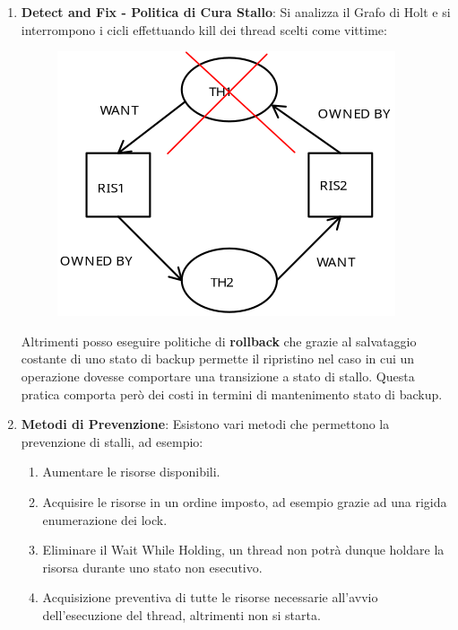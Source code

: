 \documentclass{article}
\begin{document}
\begin{enumerate}
    \item \textbf{Detect and Fix - Politica di Cura Stallo}: Si analizza il Grafo di Holt e si interrompono i cicli effettuando kill dei thread scelti come vittime:
    \begin{figure}[htbp]
        \center
        \includegraphics[scale=0.325]{img/kill_grafoHolt.png}
    \end{figure}
    Altrimenti posso eseguire politiche di \textbf{rollback} che grazie al salvataggio costante di uno stato di backup permette il ripristino nel caso in cui
    un operazione dovesse comportare una transizione a stato di stallo. Questa pratica comporta però dei costi in termini di mantenimento stato di backup.
    \newpage
    \item \textbf{Metodi di Prevenzione}: Esistono vari metodi che permettono la prevenzione di stalli, ad esempio:
    \begin{enumerate}
        \item Aumentare le risorse disponibili.
        \item Acquisire le risorse in un ordine imposto, ad esempio grazie ad una rigida enumerazione dei lock.
        \item Eliminare il Wait While Holding, un thread non potrà dunque holdare la risorsa durante uno stato non esecutivo.
        \item Acquisizione preventiva di tutte le risorse necessarie all'avvio dell'esecuzione del thread, altrimenti non si starta.
    \end{enumerate}
\end{enumerate}

\newpage
\end{document}
